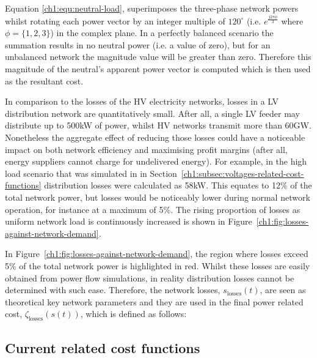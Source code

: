 

Equation \ref{ch1:equ:neutral-load}, superimposes the three-phase network powers whilst rotating each power vector by an integer multiple of $120^\circ$ (i.e. $e^\frac{j2\pi \phi}{3}$ where $\phi = \{1, 2, 3\}$) in the complex plane.
In a perfectly balanced scenario the summation results in no neutral power (i.e. a value of zero), but for an unbalanced network the magnitude value will be greater than zero.
Therefore this magnitude of the neutral's apparent power vector is computed which is then used as the resultant cost.

In comparison to the losses of the HV electricity networks, losses in a LV distribution network are quantitatively small.
After all, a single LV feeder may distribute up to 500kW of power, whilst HV networks transmit more than 60GW.
Nonetheless the aggregate effect of reducing those losses could have a noticeable impact on both network efficiency and maximising profit margins (after all, energy suppliers cannot charge for undelivered energy).
For example, in the high load scenario that was simulated in in Section~\ref{ch1:subsec:voltages-related-cost-functions} distribution losses were calculated as 58kW.
This equates to 12\% of the total network power, but losses would be noticeably lower during normal network operation, for instance at a maximum of 5\%.
The rising proportion of losses as uniform network load is continuously increased is shown in Figure~\ref{ch1:fig:losses-against-network-demand}.




In Figure~\ref{ch1:fig:losses-against-network-demand}, the region where losses exceed 5\% of the total network power is highlighted in red.
Whilst these losses are easily obtained from power flow simulations, in reality distribution losses cannot be determined with such ease.
Therefore, the network losses, $s_\text{losses}(t)$, are seen as theoretical key network parameters and they are used in the final power related cost, $\zeta_\text{losses}(s(t))$, which is defined as follows:



\subsection{Current related cost functions}
\label{ch1:subsec:currents-related-cost-functions}

